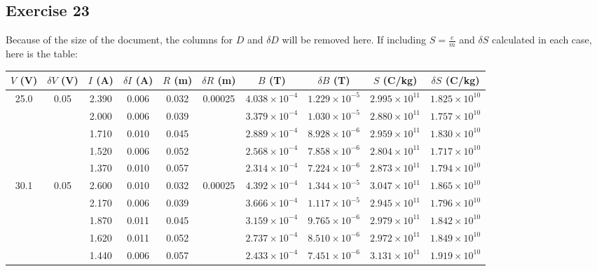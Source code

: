 \documentclass{article}
\begin{document}
\hfil

\subsection{Exercise 23}

Because of the size of the document, the columns for $D$ and $\delta D$ will be removed here. If including $S = \frac{e}{m}$ and $\delta S$ calculated in each case, here is the table:
\begin{table}[ht]
\centering
\small
\begin{tabular}{c|c||c|c||c|c||c|c||c|c}
\toprule
$V$ (V) & $\delta V$ (V)  & $I$ (A) & $\delta I$ (A) &
$R$ (m) & $\delta R$ (m) & $B$ (T) & $\delta B$ (T) & $S$ (C/kg) & $\delta S$ (C/kg) \\
\midrule
\midrule
25.0 & 0.05 & 2.390 & 0.006 & 0.032 & 0.00025 & $4.038\times10^{-4}$ & $1.229\times10^{-5}$ & $2.995\times10^{11}$ & $1.825\times10^{10}$ \\
     &      & 2.000 & 0.006 & 0.039 &          & $3.379\times10^{-4}$ & $1.030\times10^{-5}$ & $2.880\times10^{11}$ & $1.757\times10^{10}$ \\
     &      & 1.710 & 0.010 & 0.045 &          & $2.889\times10^{-4}$ & $8.928\times10^{-6}$ & $2.959\times10^{11}$ & $1.830\times10^{10}$ \\
     &      & 1.520 & 0.006 & 0.052 &          & $2.568\times10^{-4}$ & $7.858\times10^{-6}$ & $2.804\times10^{11}$ & $1.717\times10^{10}$ \\
     &      & 1.370 & 0.010 & 0.057 &          & $2.314\times10^{-4}$ & $7.224\times10^{-6}$ & $2.873\times10^{11}$ & $1.794\times10^{10}$ \\
\midrule
30.1 & 0.05 & 2.600 & 0.010 & 0.032 & 0.00025 & $4.392\times10^{-4}$ & $1.344\times10^{-5}$ & $3.047\times10^{11}$ & $1.865\times10^{10}$ \\
     &      & 2.170 & 0.006 & 0.039 &          & $3.666\times10^{-4}$ & $1.117\times10^{-5}$ & $2.945\times10^{11}$ & $1.796\times10^{10}$ \\
     &      & 1.870 & 0.011 & 0.045 &          & $3.159\times10^{-4}$ & $9.765\times10^{-6}$ & $2.979\times10^{11}$ & $1.842\times10^{10}$ \\
     &      & 1.620 & 0.011 & 0.052 &          & $2.737\times10^{-4}$ & $8.510\times10^{-6}$ & $2.972\times10^{11}$ & $1.849\times10^{10}$ \\
     &      & 1.440 & 0.006 & 0.057 &          & $2.433\times10^{-4}$ & $7.451\times10^{-6}$ & $3.131\times10^{11}$ & $1.919\times10^{10}$ \\

\end{tabular}
\end{table}
\end{document}
